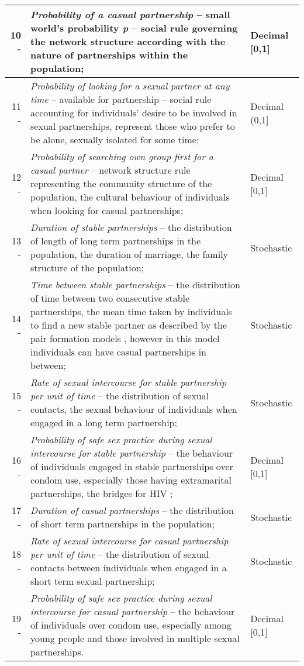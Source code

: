 \begin{longtable}[c]{|r p{11.0cm}|l|}
10 - & \emph{Probability of a casual partnership} -- small world's probability \emph{p}
-- social rule governing the network structure according with the nature of partnerships
within the population; & Decimal [0,1] \\\hline

11 - & \emph{ Probability of looking for a sexual partner at any time} -- available for
partnership -- social rule accounting for individuals' desire to be involved in
sexual partnerships, represent those who prefer to be alone, sexually isolated for some
time;  & Decimal (0,1] \\\hline

12 - & \emph{Probability of searching own group first for a casual partner} --
network structure rule representing the community structure of the population,
the cultural behaviour of individuals when looking for casual partnerships; &  Decimal
[0,1] \\\hline\hline

13 - & \emph{Duration of stable partnerships} -- the distribution of length of
long term partnerships in the population, the duration of marriage, the family structure
of the population; & Stochastic \\\hline

14 - & \emph{Time between stable partnerships} -- the distribution of time between
two consecutive stable partnerships, the mean time taken by individuals to find a new
stable partner as described by the pair formation models \cite{Dietz1988a}, however in
this model individuals can have casual partnerships in between;  &  Stochastic \\\hline

15 - & \emph{Rate of sexual intercourse for stable partnership per unit of time} --
the distribution of sexual contacts, the sexual behaviour of individuals when engaged
in a long term partnership; & Stochastic \\\hline

16 - & \emph{Probability of safe sex practice during sexual intercourse for stable
partnership} -- the behaviour of individuals engaged in stable partnerships over condom
use, especially those having extramarital partnerships, the bridges for HIV
\cite{Morris1996}; & Decimal [0,1] \\\hline\hline

17 - & \emph{Duration of casual  partnerships} -- the distribution of short term
partnerships in the population;  & Stochastic \\\hline

18 - & \emph{Rate of sexual intercourse for casual partnership per unit of time} --
the distribution of sexual contacts between individuals when engaged in a short
term sexual partnership; & Stochastic \\\hline

19 - & \emph{Probability of safe sex practice during sexual intercourse for casual
partnership} -- the behaviour of individuals over condom use, especially among young
people \cite{Wellings1994} and those involved in multiple sexual partnerships.
& Decimal [0,1] \\\hline
\end{longtable}

